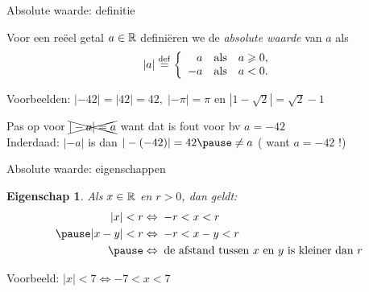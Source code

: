 \documentclass{beamer}
\theoremstyle{eigenschap}
\newtheorem{proposition}{Eigenschap}
\providecommand{\p}{\pause}
\begin{document}
\begin{frame}{Absolute waarde: definitie}
\p
\begin{definition}
Voor een reëel getal $a\in \mathbb{R}$ definiëren we de \emph{absolute waarde} van $a$ als 
$$
|a|\overset{\mathrm{def}}{=} \left\{
\begin{array}{rll  } 
   a & \mbox{als}  & a \geqslant 0, \\
  -a & \mbox{als}  & a<0.\\
\end{array}\right.
$$
\end{definition}
\vfill\p


Voorbeelden: $|-42|=|42|=42,\; |-\pi|=\pi$ en $|1-\sqrt{2}|=\sqrt{2}-1$
\vfill\p

Pas op voor $\xcancel{|-a| = a}$ want dat is fout voor bv $a=-42$ \\
Inderdaad:  $|-a|$ is dan  $|-(-42)| = 42 \p \neq a $  \p ( want $a= -42$ !) 

\end{frame}

\begin{frame}{Absolute waarde: eigenschappen}  
\p
\begin{proposition}
     Als $x \in \mathbb{R}$ en $r>0 $, dan geldt: 
     \begin{align}
         |x|<r   & \Leftrightarrow \; -r<x<r \\
\p       |x-y|<r & \Leftrightarrow \; -r<x-y<r \\
\p               & \Leftrightarrow \; \text{de afstand tussen $x$ en $y$ is kleiner dan $r$}
      \end{align}
      
     
\end{proposition}
\p\vfill

Voorbeeld: $|x| < 7 \iff -7 < x < 7$
\end{frame}
\end{document}
